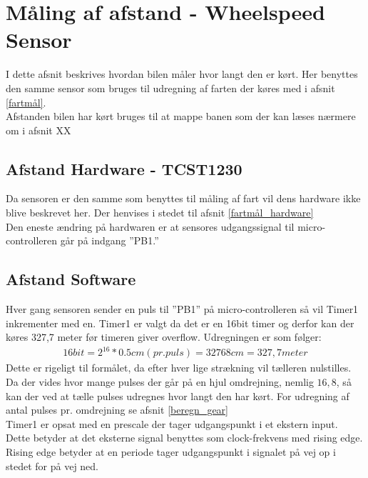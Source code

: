 \section{Måling af afstand - Wheelspeed Sensor}
\label{afstandmaal}
I dette afsnit beskrives hvordan bilen måler hvor langt den er kørt. Her benyttes den samme sensor som bruges til udregning af farten der køres med i afsnit \ref{fartmål}. \\
Afstanden bilen har kørt bruges til at mappe banen som der kan læses nærmere om i afsnit XX 

\subsection{Afstand Hardware - TCST1230}
\label{afstandmaal_hardware}
Da sensoren er den samme som benyttes til måling af fart vil dens hardware ikke blive beskrevet her. Der henvises i stedet til afsnit \ref{fartmål_hardware} \\
Den eneste ændring på hardwaren er at sensores udgangssignal til micro-controlleren går på indgang ”PB1.”

\subsection{Afstand Software}
\label{afstandmaal_software}
Hver gang sensoren sender en puls til ”PB1” på micro-controlleren så vil Timer1 inkrementer med en. Timer1 er valgt da det er en 16bit timer og derfor kan der køres 327,7 meter før timeren giver overflow. Udregningen er som følger: 
\begin{align*}
16bit = 2^16 * 0.5cm (pr. puls) = 32768 cm = 327,7 meter
\end{align*}
Dette er rigeligt til formålet, da efter hver lige strækning vil tælleren nulstilles. \\

Da der vides hvor mange pulses der går på en hjul omdrejning, nemlig \(16,8\), så kan der ved at tælle pulses udregnes hvor langt den har kørt. For udregning af antal pulses pr. omdrejning se afsnit \ref{beregn_gear} \\

Timer1 er opsat med en prescale der tager udgangspunkt i et ekstern input. Dette betyder at det eksterne signal benyttes som clock-frekvens med rising edge. Rising edge betyder at en periode tager udgangspunkt i signalet på vej op i stedet for på vej ned. 

